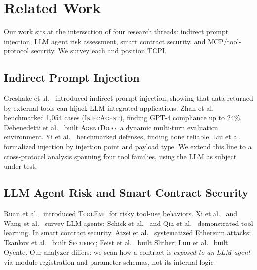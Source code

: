 \documentclass[conference]{IEEEtran}
\begin{document}
\section{Related Work}
\label{sec:related}

Our work sits at the intersection of four research threads: indirect
prompt injection, LLM agent risk assessment, smart contract security,
and MCP/tool-protocol security.  We survey each and position TCPI.

\subsection{Indirect Prompt Injection}

Greshake et al.~\cite{greshake2023injection} introduced indirect
prompt injection, showing that data returned by external tools can
hijack LLM-integrated applications.  Zhan et
al.~\cite{zhan2024systematic} benchmarked 1,054 cases (\textsc{InjecAgent}), finding GPT-4 compliance up to
24\%.  Debenedetti et al.~\cite{debenedetti2024agentdojo} built
\textsc{AgentDojo}, a dynamic multi-turn evaluation environment.  Yi et al.~\cite{yi2024benchmarking} benchmarked
defenses, finding none reliable.  Liu et al.~\cite{liu2024formalizing}
formalized injection by injection point and payload type.
We extend this line to a cross-protocol analysis spanning four tool families, using the LLM as subject under test.

\subsection{LLM Agent Risk and Smart Contract Security}

Ruan et al.~\cite{ruan2024toolemu} introduced \textsc{ToolEmu} for risky tool-use behaviors.  Xi et al.~\cite{xi2025ai} and Wang et al.~\cite{wang2024survey} survey
LLM agents; Schick et al.~\cite{schick2024toolformer} and Qin
et al.~\cite{qin2024toolllm} demonstrated tool learning.
In smart contract security, Atzei et al.~\cite{atzei2017survey} systematized Ethereum attacks; Tsankov et al.~\cite{tsankov2018securify} built \textsc{Securify}; Feist et al.~\cite{feijo2023slither} built Slither; Luu et al.~\cite{luu2016oyente} built Oyente.
Our analyzer differs: we scan how a contract is \emph{exposed to an LLM agent} via module registration and parameter schemas, not its internal logic.
\end{document}
